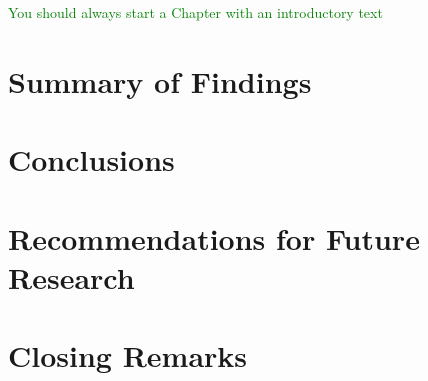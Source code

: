 \cleardoublepage
\label{chap:6conclusion}

\textcolor{green}{You should always start a Chapter with an introductory text}


\section{Summary of Findings}




\section{Conclusions}




\section{Recommendations for Future Research}




\section{Closing Remarks}

